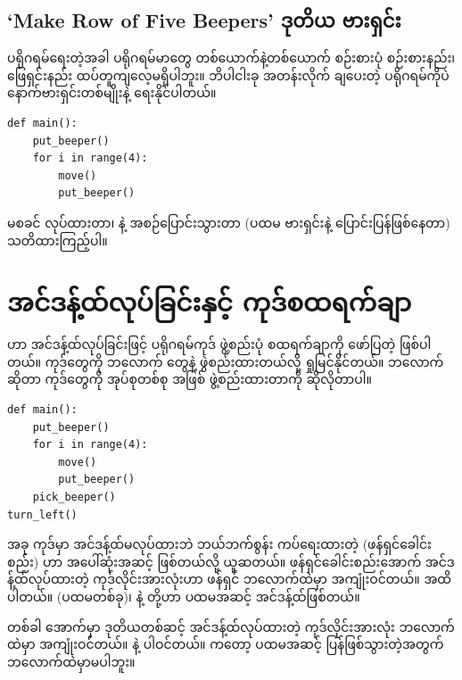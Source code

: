\subsection*{‘Make Row of Five Beepers’ ဒုတိယ ဗားရှင်း}
ပရိုဂရမ်ရေးတဲ့အခါ ပရိုဂရမ်မာတွေ တစ်ယောက်နဲ့တစ်ယောက် စဉ်းစားပုံ စဉ်းစားနည်း၊ ဖြေရှင်းနည်း ထပ်တူကျလေ့မရှိပါဘူး။ ဘိပါငါးခု အတန်းလိုက် ချပေးတဲ့ ပရိုဂရမ်ကိုပဲ နောက်ဗားရှင်းတစ်မျိုးနဲ့ ရေးနိုင်ပါတယ်။
%
\setlength{\fboxsep}{0pt}
\begin{verbatim}
def main():
    put_beeper()
    for i in range(4):
        move()
        put_beeper()
\end{verbatim}
%
  မစခင်  လုပ်ထားတာ၊  နဲ့  အစဉ်ပြောင်းသွားတာ (ပထမ ဗားရှင်းနဲ့ ပြောင်းပြန်ဖြစ်နေတာ) သတိထားကြည့်ပါ။

\section{အင်ဒန့်ထ်လုပ်ခြင်းနှင့် ကုဒ်စထရက်ချာ}

 ဟာ အင်ဒန့်ထ်လုပ်ခြင်းဖြင့် ပရိုဂရမ်ကုဒ် ဖွဲ့စည်းပုံ စထရက်ချာကို ဖော်ပြတဲ့  ဖြစ်ပါတယ်။  ကုဒ်တွေကို ဘလောက်  တွေနဲ့ ဖွဲစည်းထားတယ်လို့ ရှုမြင်နိုင်တယ်။ ဘလောက်ဆိုတာ ကုဒ်တွေကို အုပ်စုတစ်စု အဖြစ် ဖွဲ့စည်းထားတာကို ဆိုလိုတာပါ။ 
%
\setlength{\fboxsep}{0pt}
\begin{verbatim}
def main():
    put_beeper()
    for i in range(4):
        move()
        put_beeper()
    pick_beeper()
turn_left()
\end{verbatim}
%
အခု  ကုဒ်မှာ အင်ဒန့်ထ်မလုပ်ထားဘဲ  ဘယ်ဘက်စွန်း ကပ်ရေးထားတဲ့  (ဖန်ရှင်ခေါင်းစည်း) ဟာ အပေါ်ဆုံးအဆင့်  ဖြစ်တယ်လို့ ယူဆတယ်။ ဖန်ရှင်ခေါင်းစည်းအောက် အင်ဒန့်ထ်လုပ်ထားတဲ့ ကုဒ်လိုင်းအားလုံးဟာ  ဖန်ရှင် ဘလောက်ထဲမှာ အကျုံးဝင်တယ်။  အထိပါတယ်။  (ပထမတစ်ခု)၊   နဲ့  တို့ဟာ ပထမအဆင့် အင်ဒန့်ထ်ဖြစ်တယ်။ 

တစ်ခါ  အောက်မှာ ဒုတိယတစ်ဆင့် အင်ဒန့်ထ်လုပ်ထားတဲ့ ကုဒ်လိုင်းအားလုံး  ဘလောက်ထဲမှာ အကျုံး\allowbreak ဝင်တယ်။  နဲ့  ပါဝင်တယ်။  ကတော့ ပထမအဆင့် ပြန်ဖြစ်သွားတဲ့အတွက်  ဘလောက်ထဲမှာမပါဘူး။ 

